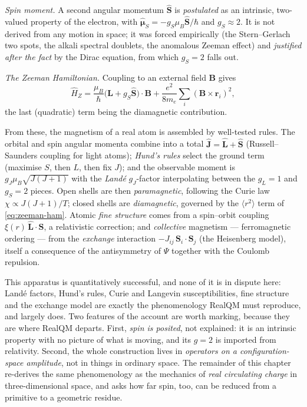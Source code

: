 \emph{Spin moment.} A second angular momentum $\hat{\mathbf S}$ is \emph{postulated} as an intrinsic, two-valued
property of the electron, with $\boldsymbol{\hat\mu}_S = -g_S\mu_B\hat{\mathbf S}/\hbar$ and $g_S \approx 2$. It is
not derived from any motion in space; it was forced empirically (the Stern--Gerlach two spots, the alkali spectral
doublets, the anomalous Zeeman effect) and \emph{justified after the fact} by the Dirac equation, from which
$g_S = 2$ falls out.

\emph{The Zeeman Hamiltonian.} Coupling to an external field $\mathbf B$ gives
\begin{equation}
\hat H_Z = \frac{\mu_B}{\hbar}\big(\hat{\mathbf L} + g_S\hat{\mathbf S}\big)\cdot\mathbf B
         + \frac{e^2}{8 m_e}\sum_i(\mathbf B\times\mathbf r_i)^2,
\label{eq:zeeman-ham}
\end{equation}
the last (quadratic) term being the diamagnetic contribution.

From these, the magnetism of a real atom is assembled by well-tested rules. The orbital and spin angular momenta
combine into a total $\hat{\mathbf J} = \hat{\mathbf L} + \hat{\mathbf S}$ (Russell--Saunders coupling for light
atoms); \emph{Hund's rules} select the ground term (maximise $S$, then $L$, then fix $J$); and the observable
moment is $g_J\mu_B\sqrt{J(J{+}1)}$ with the \emph{Land\'e} $g_J$-factor interpolating between the $g_L = 1$ and
$g_S = 2$ pieces. Open shells are then \emph{paramagnetic}, following the Curie law $\chi \propto J(J{+}1)/T$;
closed shells are \emph{diamagnetic}, governed by the $\langle r^2\rangle$ term of \eqref{eq:zeeman-ham}. Atomic
\emph{fine structure} comes from a spin--orbit coupling $\xi(r)\,\hat{\mathbf L}\!\cdot\!\hat{\mathbf S}$, a
relativistic correction; and \emph{collective} magnetism --- ferromagnetic ordering --- from the
\emph{exchange} interaction $-J_{ij}\,\mathbf S_i\!\cdot\!\mathbf S_j$ (the Heisenberg model), itself a
consequence of the antisymmetry of $\Psi$ together with the Coulomb repulsion.

This apparatus is quantitatively successful, and none of it is in dispute here: Land\'e factors, Hund's rules,
Curie and Langevin susceptibilities, fine structure and the exchange model are exactly the phenomenology RealQM
must reproduce, and largely does. Two features of the account are worth marking, because they are where RealQM
departs. First, \emph{spin is posited}, not explained: it is an intrinsic property with no picture of what is
moving, and its $g = 2$ is imported from relativity. Second, the whole construction lives in \emph{operators on
a configuration-space amplitude}, not in things in ordinary space. The remainder of this chapter re-derives the
same phenomenology as the mechanics of \emph{real circulating charge} in three-dimensional space, and asks how
far spin, too, can be reduced from a primitive to a geometric residue.

